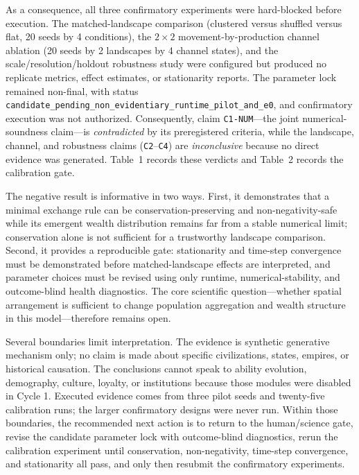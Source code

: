 \documentclass[11pt]{article}
\newcommand{\code}[1]{\texttt{#1}}
\begin{document}
\medskip
\noindent
As a consequence, all three confirmatory experiments were hard-blocked before
execution. The matched-landscape comparison (clustered versus shuffled versus
flat, 20 seeds by 4 conditions), the $2\times2$ movement-by-production channel
ablation (20 seeds by 2 landscapes by 4 channel states), and the
scale/resolution/holdout robustness study were configured but produced no
replicate metrics, effect estimates, or stationarity reports. The parameter
lock remained non-final, with status
\code{candidate\_pending\_non\_evidentiary\_runtime\_pilot\_and\_e0}, and
confirmatory execution was not authorized. Consequently, claim
\code{C1-NUM}---the joint numerical-soundness claim---is \emph{contradicted} by
its preregistered criteria, while the landscape, channel, and robustness claims
(\code{C2}--\code{C4}) are \emph{inconclusive} because no direct evidence was
generated. Table~1 records these verdicts and Table~2 records the calibration
gate.

\medskip
\noindent
The negative result is informative in two ways. First, it demonstrates that a
minimal exchange rule can be conservation-preserving and non-negativity-safe
while its emergent wealth distribution remains far from a stable numerical
limit; conservation alone is not sufficient for a trustworthy
landscape comparison. Second, it provides a reproducible gate: stationarity
and time-step convergence must be demonstrated before matched-landscape effects
are interpreted, and parameter choices must be revised using only runtime,
numerical-stability, and outcome-blind health diagnostics. The core scientific
question---whether spatial arrangement is sufficient to change population
aggregation and wealth structure in this model---therefore remains open.

\medskip
\noindent
Several boundaries limit interpretation. The evidence is synthetic generative
mechanism only; no claim is made about specific civilizations, states, empires,
or historical causation. The conclusions cannot speak to ability evolution,
demography, culture, loyalty, or institutions because those modules were
disabled in Cycle 1. Executed evidence comes from three pilot seeds and
twenty-five calibration runs; the larger confirmatory designs were never run.
Within those boundaries, the recommended next action is to return to the
human/science gate, revise the candidate parameter lock with outcome-blind
diagnostics, rerun the calibration experiment until conservation,
non-negativity, time-step convergence, and stationarity all pass, and only then
resubmit the confirmatory experiments.
\end{document}

